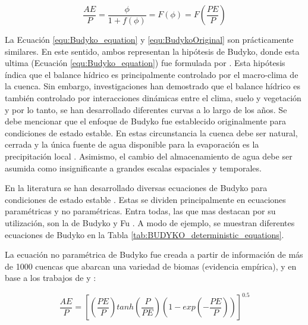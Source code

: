 \documentclass[12pt]{article}
\begin{document}
\begin{equation}
\frac{AE}{P} = \frac{\phi}{1 + f(\phi )} = F(\phi ) = F\left ( \frac{PE}{P} \right ) 
\label{equ:Budyko_equation}
\end{equation}

La Ecuación \ref{equ:Budyko_equation} y \ref{equ:BudykoOriginal} son prácticamente similares. En este sentido, ambos representan la hipótesis de Budyko, donde esta ultima (Ecuación \ref{equ:Budyko_equation}) fue formulada por \citet{arora2002use}. Esta hipótesis índica que el balance hídrico es principalmente controlado por el macro-clima de la cuenca. Sin embargo, investigaciones han demostrado que el balance hídrico es también controlado por interacciones dinámicas entre el clima, suelo y vegetación \citep{Gentine2012,Berghuijs2014,Greve2015} y por lo tanto, se han desarrollado diferentes curvas a lo largo de los años. Se debe mencionar que el enfoque de Budyko fue establecido originalmente para condiciones de estado estable. En estas circunstancia la cuenca debe ser natural, cerrada y la única fuente de agua disponible para la evaporación es la precipitación local \citep{Du2016}. Asimismo, el cambio del almacenamiento de agua debe ser asumida como insignificante a grandes escalas espaciales y temporales.

En la literatura se han desarrollado diversas ecuaciones de Budyko para condiciones de estado estable \citep{schreiber1904relationship,ol1911evaporation,turc1954water,budyko1958heat,Budyko1961,Pike1964,Fu1981,Koster1999,zhang2001response,zhou2015complementary,Wang2014,Zhang2004,Zhang2008,fathi2019new}. Estas se dividen principalmente en ecuaciones paramétricas y no paramétricas. Entra todas, las que mas destacan por su utilización, son la de Budyko \citep{budyko1958heat} y Fu \citep{Fu1981}. A modo de ejemplo, se muestran diferentes ecuaciones de Budyko en la Tabla \ref{tab:BUDYKO_deterministic_equations}.



La ecuación no paramétrica de Budyko fue creada a partir de información de más de 1000 cuencas que abarcan una variedad de biomas (evidencia empírica), y en base a los trabajos de \citet{schreiber1904relationship} y \citet{ol1911evaporation}: 

\begin{equation}
\frac{AE}{P} = \left [\left ( \frac{PE}{P} \right )tanh\left ( \frac{P}{PE} \right )(1 - exp\left ( -\frac{PE}{P} \right ))  \right ]^{0.5}
\label{equ:no_parametric_budyko_equation}
\end{equation}
\end{document}
